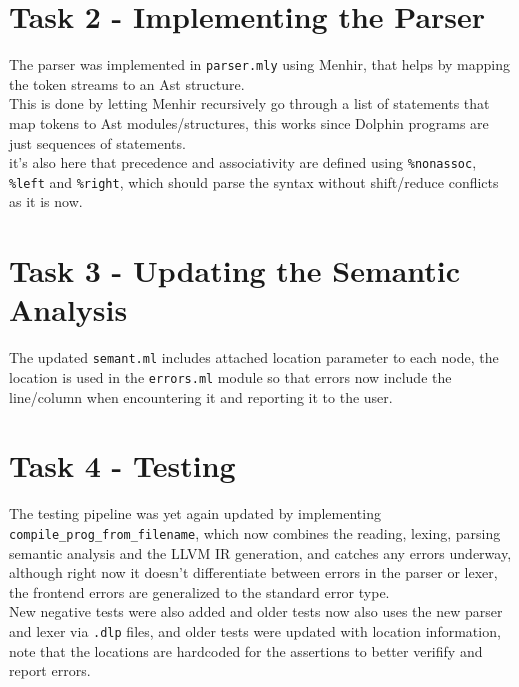 \documentclass[12pt]{article}
\begin{document}
\section*{Task 2 - Implementing the Parser}
The parser was implemented in \texttt{parser.mly} using Menhir, that helps by mapping the token streams to an Ast structure.\\
This is done by letting Menhir recursively go through a list of statements that map tokens to Ast modules/structures, this works since Dolphin programs are just sequences of statements.\\
it's also here that precedence and associativity are defined using \texttt{\%nonassoc}, \texttt{\%left} and \texttt{\%right}, which 
should parse the syntax without shift/reduce conflicts as it is now.

\section*{Task 3 - Updating the Semantic Analysis }
The updated \texttt{semant.ml} includes attached location parameter to each node, the location is used in
the \texttt{errors.ml} module so that errors now include the line/column when encountering it and reporting it to the user. 
\section*{Task 4 - Testing}
The testing pipeline was yet again updated by implementing \texttt{compile\_prog\_from\_filename}, which now combines the reading, lexing, parsing semantic analysis and the LLVM IR generation,
and catches any errors underway, although right now it doesn't differentiate between errors in the parser or lexer, the frontend errors are generalized to the standard error type.\\
\newline
New negative tests were also added and older tests now also uses the new parser and lexer via \texttt{.dlp} files, and older tests were updated with location information, note that the locations are hardcoded for the assertions to better verifify and report errors.
\end{document}
